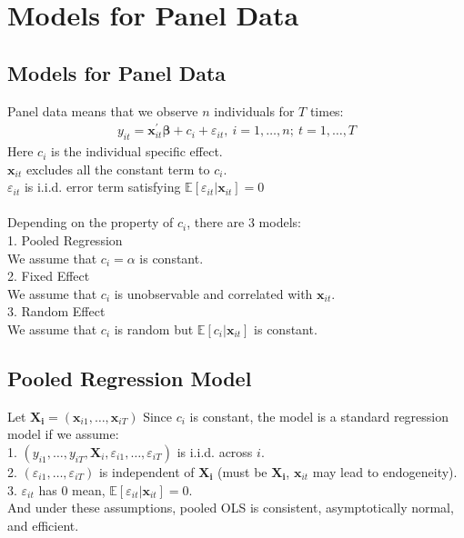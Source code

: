 \documentclass{article}
\begin{document}
\newpage
\section{Models for Panel Data}
\subsection{Models for Panel Data}
Panel data means that we observe $n$ individuals for $T$ times:
	\begin{align*}
		y_{it} = \boldsymbol{x}^\prime_{it} \boldsymbol{\beta} + c_i + \varepsilon_{it},\ i = 1, \ldots, n;\ t = 1, \ldots, T
	\end{align*}
Here $c_i$ is the individual specific effect.\\
$\boldsymbol{x}_{it}$ excludes all the constant term to $c_i$.\\
$\varepsilon_{it}$ is i.i.d. error term satisfying $\mathbb{E} [\varepsilon_{it} | \boldsymbol{x}_{it}] = 0$\\\\
Depending on the property of $c_i$, there are 3 models:\\
1. Pooled Regression\\
We assume that $c_i = \alpha$ is constant.\\
2. Fixed Effect\\
We assume that $c_i$ is unobservable and correlated with $\boldsymbol{x}_{it}$.\\
3. Random Effect\\
We assume that $c_i$ is random but $\mathbb{E} [c_i | \boldsymbol{x}_{it}]$ is constant.


\subsection{Pooled Regression Model}
Let $\boldsymbol{X_i} = (\boldsymbol{x}_{i1}, \ldots, \boldsymbol{x}_{iT})$
Since $c_i$ is constant, the model is a standard regression model if we assume:\\
1. $(y_{i1}, \ldots, y_{iT}, \boldsymbol{X}_i, \varepsilon_{i1}, \ldots, \varepsilon_{iT})$ is i.i.d. across $i$.\\
2. $(\varepsilon_{i1}, \ldots, \varepsilon_{iT})$ is independent of $\boldsymbol{X_i}$ (must be $\boldsymbol{X_i}$, $\boldsymbol{x}_{it}$ may lead to endogeneity).\\
3. $\varepsilon_{it}$ has 0 mean, $\mathbb{E} [\varepsilon_{it} | \boldsymbol{x}_{it}] = 0$.\\
And under these assumptions, pooled OLS is consistent, asymptotically normal, and efficient.
\end{document}
